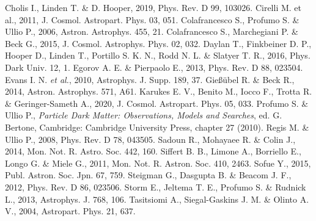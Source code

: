 \documentclass[useAMS,usenatbib]{mn2e}
\begin{document}
\begin{thebibliography}{}
 Cholis I., Linden T. \& D. Hooper, 2019, Phys. Rev. D 99, 103026.
 Cirelli M. et al., 2011, J. Cosmol. Astropart. Phys. 03, 051.
 Colafrancesco S., Profumo S. \& Ullio P., 2006, Astron. Astrophys. 455, 21.
 Colafrancesco S., Marchegiani P. \& Beck G., 2015, J. Cosmol. Astrophys. Phys. 02, 032.
 Daylan T., Finkbeiner D. P., Hooper D., Linden T., Portillo S. K. N., Rodd N. L. \& Slatyer T. R., 2016, Phys. Dark Univ. 12, 1.
 Egorov A. E. \& Pierpaolo E., 2013, Phys. Rev. D 88, 023504.
 Evans I. N. {\it et al.}, 2010, Astrophys. J. Supp. 189, 37.
 Gie\ss \"ubel R. \& Beck R., 2014, Astron. Astrophys. 571, A61.
 Karukes E. V., Benito M., Iocco F., Trotta R. \& Geringer-Sameth A., 2020, J. Cosmol. Astropart. Phys. 05, 033.
 Profumo S. \& Ullio P., {\it Particle Dark Matter: Observations, Models and Searches}, ed. G. Bertone, Cambridge: Cambridge University Press, chapter 27 (2010).
 Regis M. \& Ullio P., 2008, Phys. Rev. D 78, 043505.
 Sadoun R., Mohayaee R. \& Colin J., 2014, Mon. Not. R. Astro. Soc. 442, 160.
 Siffert B. B., Limone A., Borriello E., Longo G. \& Miele G., 2011, Mon. Not. R. Astron. Soc. 410, 2463.
 Sofue Y., 2015, Publ. Astron. Soc. Jpn. 67, 759.
 Steigman G., Dasgupta B. \& Beacom J. F., 2012, Phys. Rev. D 86, 023506.
 Storm E., Jeltema T. E., Profumo S. \& Rudnick L., 2013, Astrophys. J. 768, 106.
 Tasitsiomi A., Siegal-Gaskins J. M. \& Olinto A. V., 2004, Astropart. Phys. 21, 637.
\end{thebibliography}

\label{lastpage}
\end{document}
